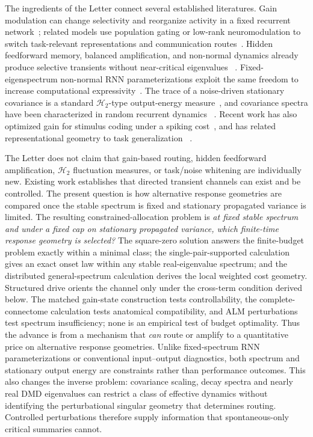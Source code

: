 \documentclass[
  aps,prl,preprint,notitlepage,superscriptaddress,nofootinbib,longbibliography,
  amsmath,amssymb
]{revtex4-2}
\begin{document}
The ingredients of the Letter connect several established literatures.  Gain
modulation can change selectivity and reorganize activity in a fixed recurrent
network~\cite{zhangabbott2000,stroud2018}; related models use population gating
or low-rank neuromodulation to switch task-relevant representations and
communication routes~\cite{semedo2019,barbosa2023,costacurta2024}.  Hidden
feedforward memory, balanced amplification, and non-normal dynamics already
produce selective transients without near-critical eigenvalues
~\cite{ganguli2008,goldman2009,murphy2009,hennequin2012,hennequin2014,bondanelli2020,christodoulou2022}.
Fixed-eigenspectrum non-normal RNN parameterizations exploit the same freedom to
increase computational expressivity~\cite{kerg2019}.
The trace of a noise-driven stationary covariance is a standard
$\mathcal H_2$-type output-energy measure~\cite{jovanovic2005}, and covariance
spectra have been characterized in random recurrent dynamics
~\cite{hu2022,zavatoneveth2026}.  Recent work has also optimized gain for
stimulus coding under a spiking cost~\cite{pratcarrabin2026}, and
has related representational geometry to task generalization
~\cite{wakhloo2026}.

The Letter does not claim that gain-based routing, hidden feedforward
amplification, $\mathcal H_2$ fluctuation measures, or task/noise whitening are
individually new.  Existing work establishes that directed transient channels
can exist and be controlled.  The present question is how alternative response
geometries are compared once the stable spectrum is fixed and stationary
propagated variance is limited.  The resulting constrained-allocation problem is
\emph{at fixed stable spectrum and under a fixed cap on stationary propagated variance,
which finite-time response geometry is selected?}  The square-zero solution
answers the finite-budget problem exactly within a minimal class; the
single-pair-supported calculation gives an exact onset law within any stable
real-eigenvalue spectrum; and the distributed general-spectrum calculation
derives the local weighted cost geometry.  Structured drive orients the channel
only under the cross-term condition derived below.  The matched gain-state
construction tests controllability, the complete-connectome calculation tests
anatomical compatibility, and ALM perturbations test spectrum insufficiency;
none is an empirical test of budget optimality.  Thus the advance is from a
mechanism that \emph{can} route or amplify to a quantitative price on alternative
response geometries.  Unlike fixed-spectrum RNN parameterizations or
conventional input--output diagnostics, both spectrum and stationary output
energy are constraints rather than performance outcomes.
This also changes the inverse problem: covariance scaling, decay spectra and
nearly real DMD eigenvalues can restrict a class of effective dynamics without
identifying the perturbational singular geometry that determines routing.
Controlled perturbations therefore supply information that spontaneous-only
critical summaries cannot.
\end{document}
